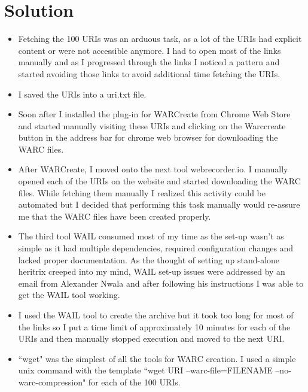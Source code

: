 \section{Solution}
\begin{itemize}
\item Fetching the 100 URIs was an arduous task, as a lot of the URIs had explicit content or were not accessible anymore. I had to open most of the links manually and as I progressed through the links I noticed a pattern and started avoiding those links to avoid additional time fetching the URIs.
\item I saved the URIs into a uri.txt file.
\item Soon after I installed the plug-in for WARCreate from Chrome Web Store and started manually visiting these URIs and clicking on the Warccreate button in the address bar for chrome web browser for downloading the WARC files.
\item After WARCreate, I moved onto the next tool webrecorder.io. I manually opened each of the URIs on the website and started downloading the WARC files. While fetching them manually I realized this activity could be automated but I decided that performing this task manually would re-assure me that the WARC files have been created properly.
\item The third tool WAIL consumed most of my time as the set-up wasn't as simple as it had multiple dependencies, required configuration changes and lacked proper documentation. As the thought of setting up stand-alone heritrix creeped into my mind, WAIL set-up issues were addressed by an email from Alexander Nwala and after following his instructions I was able to get the WAIL tool working.
\item I used the WAIL tool to create the archive but it took too long for most of the links so I put a time limit of approximately 10 minutes for each of the URIs and then manually stopped execution and moved to the next URI.
\item ``wget" was the simplest of all the tools for WARC creation. I used a simple unix command with the template ``wget URI --warc-file=FILENAME --no-warc-compression" for each of the 100 URIs.
\end{itemize}

